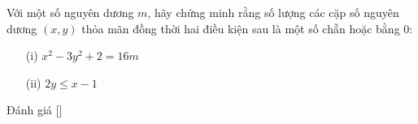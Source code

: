 \ifshowproblem
\begin{problem}\label{problem:KOR-2015-MO-P1}
    Với một số nguyên dương \( m \), hãy chứng minh rằng số lượng các cặp số nguyên dương \( (x, y) \)
    thỏa mãn đồng thời hai điều kiện sau là một số chẵn hoặc bằng \( 0 \):
    \begin{itemize}[topsep=0pt, partopsep=0pt, itemsep=0pt]
        \item[(i)] \( x^2 - 3y^2 + 2 = 16m \)
        \item[(ii)] \( 2y \le x - 1 \)
    \end{itemize}
\end{problem}
\fi

\ifshowinfo
Đánh giá [\textbf{}]\footnotemark
{}
\fi